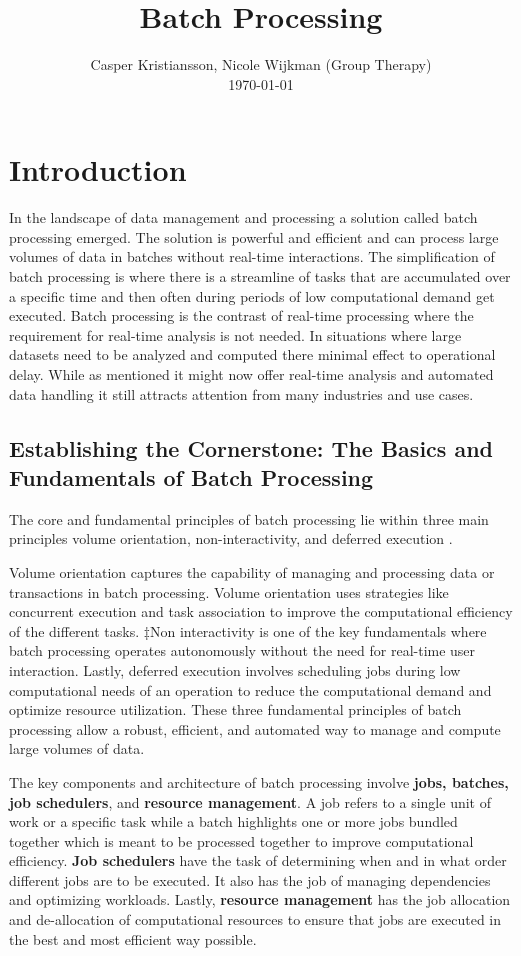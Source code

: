 \documentclass[10pt]{proc}
\begin{document}
\title{\textbf{Batch Processing}}
\author{Casper Kristiansson, Nicole Wijkman (Group Therapy)\\[1ex] \today}
\maketitle

\section{Introduction}
In the landscape of data management and processing a solution called batch processing emerged. The solution is powerful and efficient and can process large volumes of data in batches without real-time interactions. The simplification of batch processing is where there is a streamline of tasks that are accumulated over a specific time and then often during periods of low computational demand get executed. Batch processing is the contrast of real-time processing where the requirement for real-time analysis is not needed. In situations where large datasets need to be analyzed and computed there minimal effect to operational delay. While as mentioned it might now offer real-time analysis and automated data handling it still attracts attention from many industries and use cases.

\subsection{Establishing the Cornerstone: The Basics and Fundamentals of Batch Processing}
The core and fundamental principles of batch processing lie within three main principles volume orientation, non-interactivity, and deferred execution \cite{amazonWhatBatch}. 

Volume orientation captures the capability of managing and processing data or transactions in batch processing. Volume orientation uses strategies like concurrent execution and task association to improve the computational efficiency of the different tasks. ‡Non interactivity is one of the key fundamentals where batch processing operates autonomously without the need for real-time user interaction. Lastly, deferred execution involves scheduling jobs during low computational needs of an operation to reduce the computational demand and optimize resource utilization. These three fundamental principles of batch processing allow a robust, efficient, and automated way to manage and compute large volumes of data.

The key components and architecture of batch processing involve \textbf{jobs, batches, job schedulers}, and \textbf{resource management}. A job refers to a single unit of work or a specific task while a batch highlights one or more jobs bundled together which is meant to be processed together to improve computational efficiency. \textbf{Job schedulers} have the task of determining when and in what order different jobs are to be executed. It also has the job of managing dependencies and optimizing workloads. Lastly, \textbf{resource management} has the job allocation and de-allocation of computational resources to ensure that jobs are executed in the best and most efficient way possible.
\end{document}

